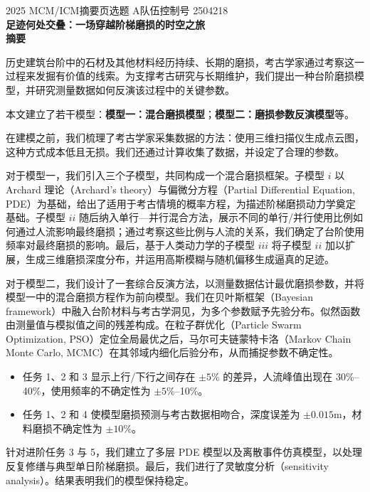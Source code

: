 \documentclass[11pt,a4paper,fontset=windows]{ctexart}
\begin{document}
\thispagestyle{empty}
\begin{center}
{\small 2025 MCM/ICM\quad 摘要页\quad 选题 A\quad 队伍控制号 2504218}\\[1.6em]
{\LARGE\bfseries 足迹何处交叠：一场穿越阶梯磨损的时空之旅}\\[1.2em]
{\large\bfseries 摘要}
\end{center}

历史建筑台阶中的石材及其他材料经历持续、长期的磨损，考古学家通过考察这一过程来发掘有价值的线索。为支撑考古研究与长期维护，我们提出一种台阶磨损模型，并研究测量数据如何反演该过程中的关键参数。

本文建立了若干模型：\textbf{模型一：混合磨损模型}；\textbf{模型二：磨损参数反演模型}等。

在建模之前，我们梳理了考古学家采集数据的方法：使用三维扫描仪生成点云图，这种方式成本低且无损。我们还通过计算收集了数据，并设定了合理的参数。

对于模型一，我们引入三个子模型，共同构成一个混合磨损框架。子模型 $i$ 以 Archard 理论（Archard's theory）与偏微分方程（Partial Differential Equation, PDE）为基础，给出了适用于考古情境的概率方程，为描述阶梯磨损动力学奠定基础。子模型 $ii$ 随后纳入单行—并行混合方法，展示不同的单行/并行使用比例如何通过人流影响最终磨损；通过考察这些比例与人流的关系，我们确定了台阶使用频率对最终磨损的影响。最后，基于人类动力学的子模型 $iii$ 将子模型 $ii$ 加以扩展，生成三维磨损深度分布，并运用高斯模糊与随机偏移生成逼真的足迹。

对于模型二，我们设计了一套综合反演方法，以测量数据估计最优磨损参数，并将模型一中的混合磨损方程作为前向模型。我们在贝叶斯框架（Bayesian framework）中融入台阶材料与考古学洞见，为多个参数赋予先验分布。似然函数由测量值与模拟值之间的残差构成。在粒子群优化（Particle Swarm Optimization, PSO）定位全局最优之后，马尔可夫链蒙特卡洛（Markov Chain Monte Carlo, MCMC）在其邻域内细化后验分布，从而捕捉参数不确定性。

\begin{itemize}
\item 任务 1、2 和 3 显示上行/下行之间存在 $\pm5\%$ 的差异，人流峰值出现在 30\%--40\%，使用频率的不确定性为 $\pm5\%$--10\%。
\item 任务 1、2 和 4 使模型磨损预测与考古数据相吻合，深度误差为 $\pm0.015$m，材料磨损不确定性为 $\pm10\%$。
\end{itemize}

针对进阶任务 3 与 5，我们建立了多层 PDE 模型以及离散事件仿真模型，以处理反复修缮与典型单日阶梯磨损。最后，我们进行了灵敏度分析（sensitivity analysis）。结果表明我们的模型保持稳定。
\end{document}
